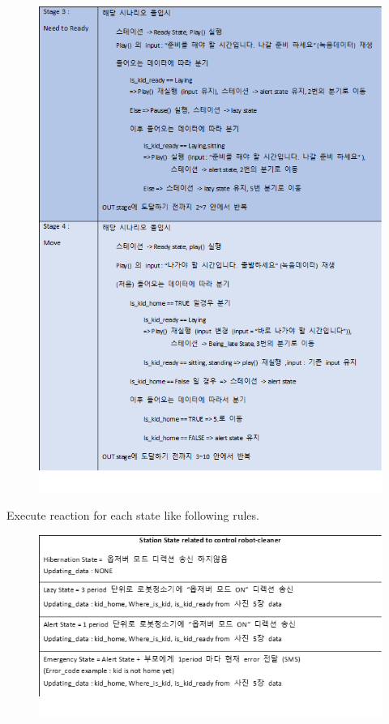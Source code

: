 \documentclass[conference]{IEEEtran}
\begin{document}
\begin{enumerate}[label=\arabic*.]
\begin{enumerate}[label=\arabic*.]
\begin{enumerate}[label=\alph*.]
        \begin{figure}[H]\centering\includegraphics[scale=0.35]{images/rule2.png}\end{figure}
        Execute reaction for each state like following rules.
        \begin{figure}[H]\centering\includegraphics[scale=0.35]{images/rule3.png}\end{figure}

\end{enumerate}
\end{enumerate}
\end{enumerate}
\end{document}
